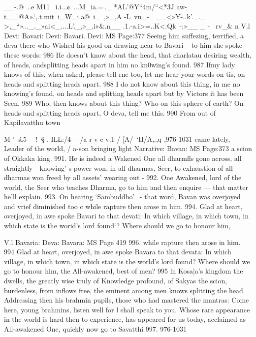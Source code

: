    
   __-.@~..e M11 ~i.i...¢~...M_ia.=\,._ *AL'\;@Y“4m/“<\`*3J aw-t__.@A».`,.t.mit~i_W_i.a@~i\_~,»_,A -L~vn_-~~__<»¥-..k'._._ >,\_“»..._._»ai<_....L'._,»_.i»&.n__ .1.-a.i>=..K<.Qk~-;»__ _ - ~\>rv_& n
   V.l
   Devi:
   Bavari:
   Devi:
   Bavari.
   Devi:
   MS Page:377
   Seeing him suffezing, terriﬁed,
   a deva there who Wished his good
   on drawing near to Bavari ~
   to him she spoke these words: 986
   He doesn't know about the head,
   that charlatau desiring wealth,
   of heads, andsplitting heads apart
   in him no kn0wing's found. 987
   Ifmy lady knows of this,
   when asked, please tell rne too,
   let me hear your words on tis,
   on heads and splitting heads apart. 988
   I do not know about this thing,
   in me no knowing's found,
   on heads and splitting heads apart
   but by Victors it has been Seen. 989
   Who, then knows about this thing?
   Who on this sphere of earth?
   On heads and splitting heads apart,
   O deva, tell me this. 990
   From out of Kapilavatthu town
   
   
   
   M '\  £5 \ 
   \ !~§
   . ILL:/4—
   /a r v e
   v.1 / [A/\ `H/A,.,q ,976-1031
   came lately, Leader of the world,
   / a-son bringing light
   Narrative:
   Bavan:
   MS Page:373
   a scion of Okkaka king. 991.
   He is indeed a Wakened One
   all dharmﬂs gone across,
   all straightly—knowing' s power won,
   in all dharmas, Seer,
   to exhaustion of all dharmas won
   freed by all assets' wearing out - 992.
   One Awakened, lord of the world,
   the Seer who teaches Dharma,
   go to him and then enquire —
   that matter he'll explain. 993.
   On hearing `Sambuddho'_- that word,
   Bavan was overjoyed
   and vrief diminished too
   c
   while rapture then arose in him. 994.
   Glad at heart, overjoyed, in awe
   spoke Bavari to that devati:
   In which village, in which town,
   in which state is the worid's lord found`?
   Where should we go to honour him,
   
   
   
   V.l
   Bavaria:
   Deva:
   Bavara:
   MS Page 419
   996.
   while rapture then arose in him. 994
   Glad at heart, overjoyed, in awe
   spoke Bavara to that devata:
   In which village, in which town,
   in which state is the world's lord found?
   Where should we go to honour him,
   the All-awakened, best of men? 995
   ln Kosa|a's kingdom the  dwells,
   the greatly wise truly of Knowledge profound,
   of Sakyas the scion, burdenless, from inﬂows free,
   the eminent among men knows splitting the head.
   Addressing then his brahmin pupils,
   those who had mastered the mantras:
   Come here, young brahmins, listen well
   for l shall speak to you.
   Whose rare appearance in the world
   is hard then to experience,
   has appeared for us today,
   acclaimed as All-awakened One,
   quickly now go to Savatthi
   997.
   976-1031
   
